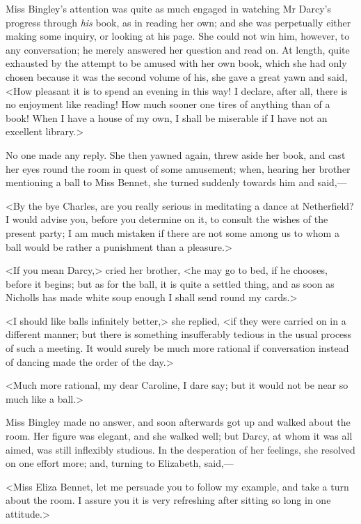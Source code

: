 Miss Bingley's attention was quite as much engaged in watching Mr Darcy's progress through \textit{his} book, as in reading her own; and she was perpetually either making some inquiry, or looking at his page. She could not win him, however, to any conversation; he merely answered her question and read on. At length, quite exhausted by the attempt to be amused with her own book, which she had only chosen because it was the second volume of his, she gave a great yawn and said, <How pleasant it is to spend an evening in this way! I declare, after all, there is no enjoyment like reading! How much sooner one tires of anything than of a book! When I have a house of my own, I shall be miserable if I have not an excellent library.>

No one made any reply. She then yawned again, threw aside her book, and cast her eyes round the room in quest of some amusement; when, hearing her brother mentioning a ball to Miss Bennet, she turned suddenly towards him and said,—

<By the bye Charles, are you really serious in meditating a dance at Netherfield? I would advise you, before you determine on it, to consult the wishes of the present party; I am much mistaken if there are not some among us to whom a ball would be rather a punishment than a pleasure.>

<If you mean Darcy,> cried her brother, <he may go to bed, if he chooses, before it begins; but as for the ball, it is quite a settled thing, and as soon as Nicholls has made white soup enough I shall send round my cards.>

<I should like balls infinitely better,> she replied, <if they were carried on in a different manner; but there is something insufferably tedious in the usual process of such a meeting. It would surely be much more rational if conversation instead of dancing made the order of the day.>

<Much more rational, my dear Caroline, I dare say; but it would not be near so much like a ball.>

Miss Bingley made no answer, and soon afterwards got up and walked about the room. Her figure was elegant, and she walked well; but Darcy, at whom it was all aimed, was still inflexibly studious. In the desperation of her feelings, she resolved on one effort more; and, turning to Elizabeth, said,—

<Miss Eliza Bennet, let me persuade you to follow my example, and take a turn about the room. I assure you it is very refreshing after sitting so long in one attitude.>


